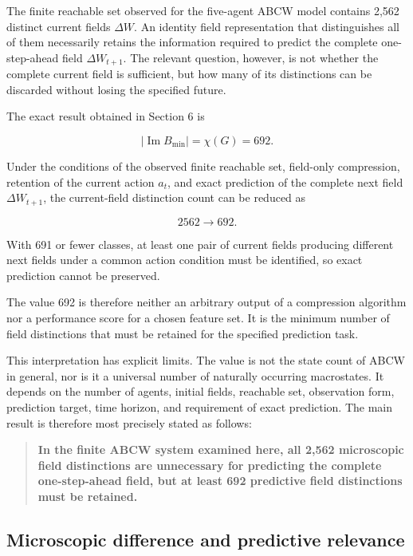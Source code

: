 \documentclass[
  11pt,
]{article}
\begin{document}
The finite reachable set observed for the five-agent ABCW model contains
2,562 distinct current fields \({\Delta W}\). An identity field
representation that distinguishes all of them necessarily retains the
information required to predict the complete one-step-ahead field
\({\Delta W_{t+1}}\). The relevant question, however, is not whether the
complete current field is sufficient, but how many of its distinctions
can be discarded without losing the specified future.

The exact result obtained in Section 6 is

\[{|\operatorname{Im}B_{\min}|=\chi(G)=692.}\]

Under the conditions of the observed finite reachable set, field-only
compression, retention of the current action \({a_t}\), and exact
prediction of the complete next field \({\Delta W_{t+1}}\), the
current-field distinction count can be reduced as

\[{2562\longrightarrow692.}\]

With 691 or fewer classes, at least one pair of current fields producing
different next fields under a common action condition must be
identified, so exact prediction cannot be preserved.

The value 692 is therefore neither an arbitrary output of a compression
algorithm nor a performance score for a chosen feature set. It is the
minimum number of field distinctions that must be retained for the
specified prediction task.

This interpretation has explicit limits. The value is not the state
count of ABCW in general, nor is it a universal number of naturally
occurring macrostates. It depends on the number of agents, initial
fields, reachable set, observation form, prediction target, time
horizon, and requirement of exact prediction. The main result is
therefore most precisely stated as follows:

\begin{quote}
\textbf{In the finite ABCW system examined here, all 2,562 microscopic
field distinctions are unnecessary for predicting the complete
one-step-ahead field, but at least 692 predictive field distinctions
must be retained.}
\end{quote}

\hypertarget{microscopic-difference-and-predictive-relevance}{%
\subsection{Microscopic difference and predictive
relevance}\label{microscopic-difference-and-predictive-relevance}}
\end{document}
